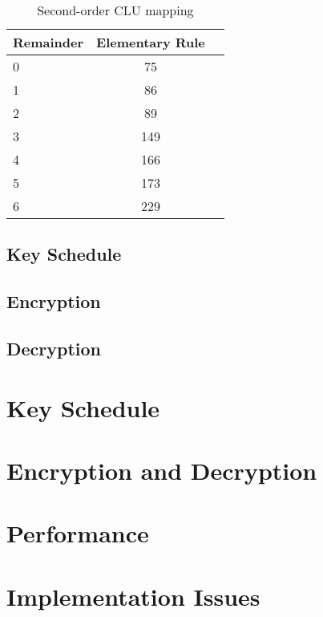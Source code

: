 \documentclass{article}
\begin{document}
\begin{table}[h!]
  \begin{center}
    \caption{Second-order CLU mapping}
    \label{tab:table2}
    \begin{tabular}{l|c|r} %
      \textbf{Remainder} & \textbf{Elementary Rule}\\
      \hline
      0 & 75\\
      1 & 86\\
      2 & 89\\
      3 & 149\\
      4 & 166\\
      5 & 173\\
      6 & 229\\
    \end{tabular}
  \end{center}
\end{table}

\subsection{Key Schedule}

\subsection{Encryption}

\subsection{Decryption}

\section{Key Schedule}

\section{Encryption and Decryption}

\section{Performance}

\section{Implementation Issues}
\end{document}
